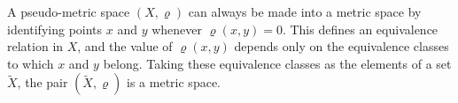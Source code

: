 A pseudo-metric space $(X, \varrho)$ can always be made into a metric space by identifying points $x$ and $y$ whenever $\varrho(x, y) = 0$. This defines an equivalence relation in $X$, and the value of $\varrho(x, y)$ depends only on the equivalence classes to which $x$ and $y$ belong. Taking these equivalence classes as the elements of a set $\tilde{X}$, the pair $(\tilde{X}, \varrho)$ is a metric space.
